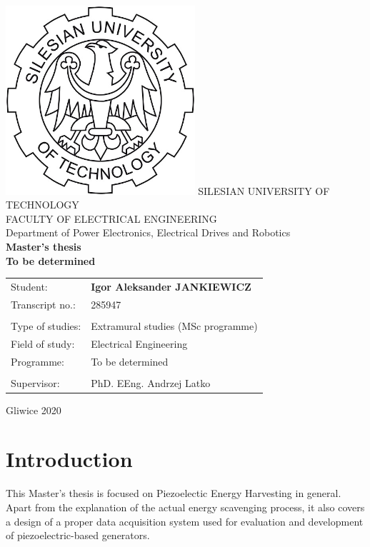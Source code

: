 \documentclass[12pt,a4paper]{article}
\begin{document}
\begin{titlepage}
    \centering
    \includegraphics[width=7cm]{logo.jpg} %
    \vskip1cm
    {\Large
        SILESIAN UNIVERSITY OF TECHNOLOGY\\
        FACULTY OF ELECTRICAL ENGINEERING\\
        \vskip0.5cm
        Department of Power Electronics, Electrical Drives and Robotics\\
    }
    \vskip1cm
    {\bfseries\huge
    Master's thesis\\
    }
    \vskip1cm
    {\bfseries\large
    To be determined \\
    }
    \vskip2cm
    {\large
    \begin{tabular}{p{4cm} p{10cm}}
    Student: & {\bfseries\Large Igor Aleksander JANKIEWICZ}\\
    Transcript no.: & 285947\\
        &   \\
    Type of studies: & Extramural studies (MSc programme)\\
    Field of study: & Electrical Engineering\\
    Programme: & To be determined\\
        &   \\
    Supervisor: & PhD. EEng. Andrzej Latko\\
    \end{tabular}
    }
    \vskip2.5cm
    {\large
    Gliwice 2020}
\end{titlepage}
\newpage\null\thispagestyle{empty}\newpage
\tableofcontents
\newpage\null\thispagestyle{empty}\newpage

\section{Introduction}
This Master's thesis is focused on Piezoelectic Energy Harvesting in general. Apart from the explanation of the actual energy scavenging process, it also covers a design of a proper data acquisition system used for evaluation and development of piezoelectric-based generators.
\par
\end{document}
